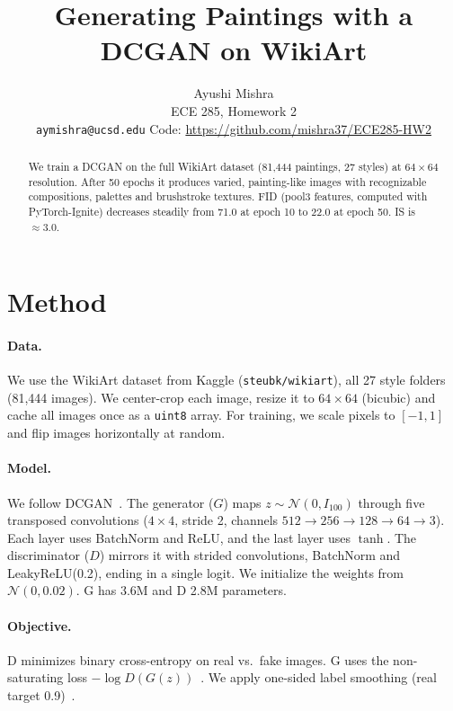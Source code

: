 \documentclass{article}
\title{Generating Paintings with a DCGAN on WikiArt}
\author{Ayushi Mishra \\ ECE 285, Homework 2 \\ \texttt{aymishra@ucsd.edu} \quad Code: \url{https://github.com/mishra37/ECE285-HW2}}
\begin{document}
\vspace{-2em}
\maketitle
\vspace{-1.5em}

\begin{abstract}
We train a DCGAN on the full WikiArt dataset (81{,}444 paintings, 27 styles) at $64\times64$ resolution. After 50 epochs it produces varied, painting-like images with recognizable compositions, palettes and brushstroke textures. FID (pool3 features, computed with PyTorch-Ignite) decreases steadily from 71.0 at epoch 10 to 22.0 at epoch 50. IS is $\approx3.0$.
\end{abstract}

\section{Method}
\paragraph{Data.} We use the WikiArt dataset from Kaggle (\texttt{steubk/wikiart}), all 27 style folders (81{,}444 images). We center-crop each image, resize it to $64\times64$ (bicubic) and cache all images once as a \texttt{uint8} array. For training, we scale pixels to $[-1,1]$ and flip images horizontally at random.

\paragraph{Model.} We follow DCGAN~\cite{radford2016dcgan}. The generator ($G$) maps $z\sim\mathcal{N}(0,I_{100})$ through five transposed convolutions ($4\times4$, stride 2, channels $512\!\to\!256\!\to\!128\!\to\!64\!\to\!3$). Each layer uses BatchNorm and ReLU, and the last layer uses $\tanh$. The discriminator ($D$) mirrors it with strided convolutions, BatchNorm and LeakyReLU(0.2), ending in a single logit. We initialize the weights from $\mathcal{N}(0,0.02)$. G has 3.6M and D 2.8M parameters.

\paragraph{Objective.} D minimizes binary cross-entropy on real vs.\ fake images. G uses the non-saturating loss $-\log D(G(z))$~\cite{goodfellow2014gan}. We apply one-sided label smoothing (real target 0.9)~\cite{salimans2016improved}.
\end{document}
